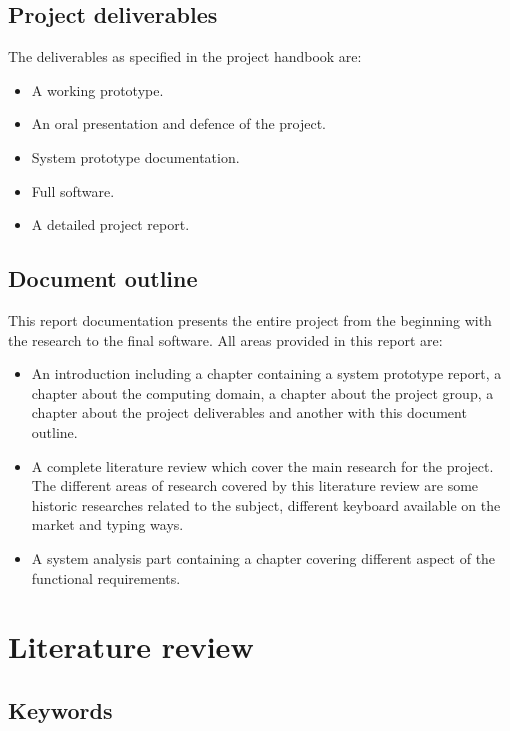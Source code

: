\chapter{Project deliverables}
The deliverables as specified in the project handbook are:
\begin{itemize}
\item A working prototype.
\item An oral presentation and defence of the project.
\item System prototype documentation.
\item Full software.
\item A detailed project report.
\end{itemize}

\chapter{Document outline}
This report documentation presents the entire project from the beginning with the research to the final software.
All areas provided in this report are:
\begin{itemize}
\item An introduction including a chapter containing a system prototype report, a chapter about the computing domain, a chapter about the project group, a chapter about the project deliverables and another with this document outline.
\item A complete literature review which cover the main research for the project. The different areas of research covered by this literature review are some historic researches related to the subject, different keyboard available on the market and typing ways.  
\item A system analysis part containing a chapter covering different aspect of the functional requirements. 
\end{itemize}

\part{Literature review}
%
\chapter*{Keywords}
\begin{sortedlist}
\end{sortedlist}



